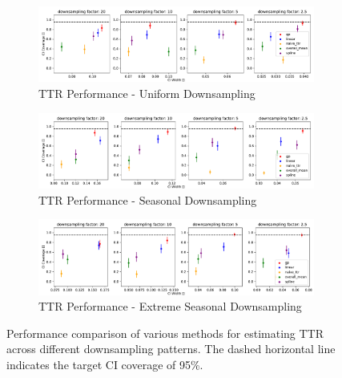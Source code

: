 \begin{figure}[!htb]
\centering
\begin{subfigure}{\textwidth}
    \centering
    \includegraphics[width=\linewidth]{Pictures/final_experiments_spline_ridge_quantile_max100/ttr_eval_sin_rbf_default}
    \caption{TTR Performance - Uniform Downsampling}
    \label{fig:ttr-uniform-sampling-performance}
\end{subfigure}

\bigskip

\begin{subfigure}{\textwidth}
    \centering
    \includegraphics[width=\linewidth]{Pictures/final_experiments_spline_ridge_quantile_max100/ttr_eval_sin_rbf_seasonal_default}
    \caption{TTR Performance - Seasonal Downsampling}
    \label{fig:ttr-seasonal-sampling-performance}
\end{subfigure}

\bigskip

\begin{subfigure}{\textwidth}
    \centering
    \includegraphics[width=\linewidth]{Pictures/final_experiments_spline_ridge_quantile_max100/ttr_eval_sin_rbf_seasonal_extreme}
    \caption{TTR Performance - Extreme Seasonal Downsampling}
    \label{fig:ttr-extreme-seasonal-sampling-performance}
\end{subfigure}

\caption[TTR Performance]{Performance comparison of various methods for
estimating TTR across different downsampling patterns.
The dashed horizontal line indicates the target CI coverage of 95\%.
}
\label{fig:ttr-performance}
\end{figure}


